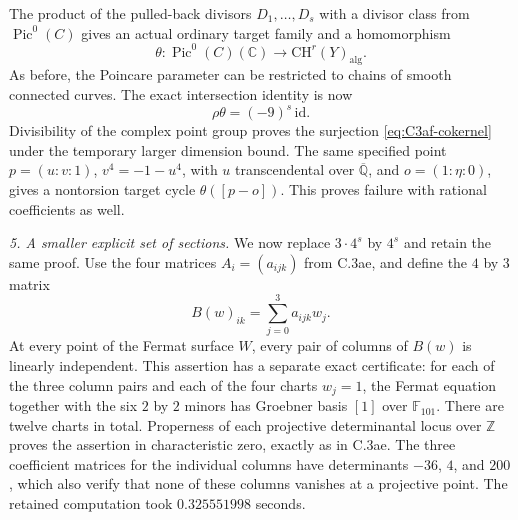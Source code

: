 The product of the pulled-back divisors
$D_1,\ldots,D_s$ with a divisor class from
$\operatorname{Pic}^0(C)$ gives an actual ordinary
target family and a homomorphism
\[
 \theta:\operatorname{Pic}^0(C)(\mathbb C)
                    \longrightarrow\mathrm{CH}^r(Y)_{\mathrm{alg}}.
\]
As before, the Poincare parameter can be restricted
to chains of smooth connected curves. The exact
intersection identity is now
\[
                         \rho\theta=(-9)^s\,\mathrm{id}.
\]
Divisibility of the complex point group proves
the surjection \eqref{eq:C3af-cokernel} under the
temporary larger dimension bound. The same
specified point $p=(u:v:1)$, $v^4=-1-u^4$, with
$u$ transcendental over $\overline{\mathbb Q}$,
and $o=(1:\eta:0)$, gives a nontorsion target
cycle $\theta([p-o])$. This proves failure with
rational coefficients as well.

\emph{5. A smaller explicit set of sections.}
We now replace $3\cdot4^s$ by $4^s$ and retain the
same proof. Use the four matrices $A_i=(a_{ijk})$
from C.3ae, and define the $4$ by $3$ matrix
\[
                       B(w)_{ik}=\sum_{j=0}^3a_{ijk}w_j.
\]
At every point of the Fermat surface $W$, every
pair of columns of $B(w)$ is linearly independent.
This assertion has a separate exact certificate:
for each of the three column pairs and each of
the four charts $w_j=1$, the Fermat equation
together with the six $2$ by $2$ minors has
Groebner basis $[1]$ over $\mathbb F_{101}$.
There are twelve charts in total. Properness
of each projective determinantal locus over
$\mathbb Z$ proves the assertion in characteristic
zero, exactly as in C.3ae. The three coefficient
matrices for the individual columns have
determinants $-36$, $4$, and $200$, which also
verify that none of these columns vanishes at
a projective point. The retained computation
took $0.325551998$ seconds.

